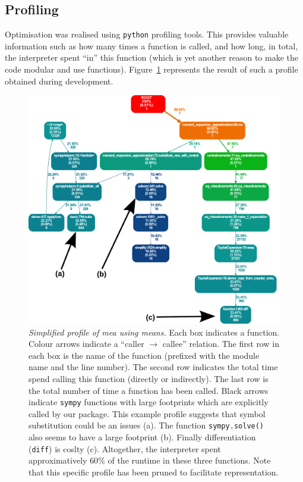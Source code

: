 \documentclass[11pt,a4paper]{article}
\newcommand{\py}{\texttt{python}}
\newcommand{\sympy}{\texttt{sympy}}
\begin{document}
\subsection{Profiling}
Optimisation was realised using \py{} profiling tools.
This provides valuable information such as how many times a function is called, and how long, in total,
the interpreter spent ``in'' this function (which is yet another reason to make the code modular and use functions).
Figure~\ref{fig:profile} represents the result of such a profile obtained during development.


\begin{figure}[tbh]
\includegraphics[width=0.95\textwidth{}]{profile.pdf}
\caption{\emph{Simplified profile of \gls{mea} using means.}
Each box indicates a function. 
Colour arrows indicate a ``caller $ \rightarrow $ callee'' relation.
The first row in each box is the name of the function (prefixed with the module name and the line number).
The second row indicates the total time spend calling this function (directly or indirectly).
The last row is the total number of time a function has been called.
Black arrows indicate \sympy{} functions with large footprints which are explicitly called by our package.
This example profile suggests that symbol substitution could be an issues (a). 
The function \texttt{sympy.solve()} also seems to have a large footprint (b).
Finally differentiation (\texttt{diff}) is coslty (c).
Altogether, the interpreter spent approximatively $60\%$ 
of the runtime in these three functions. 
Note that this specific profile has been pruned to facilitate representation. 
}

\label{fig:profile}
\end{figure}
\end{document}
